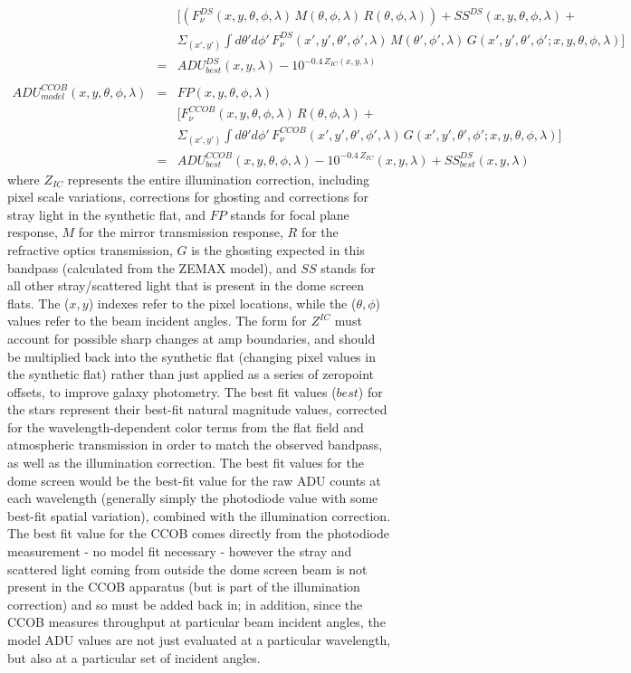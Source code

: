 \documentclass[12pt,preprint]{aastex}
\begin{document}
\begin{figure}[htbp]
{\begin{eqnarray}
& & [(F_\nu^{DS}(x,y,\theta,\phi,\lambda)\,M(\theta,\phi,\lambda)\,R(\theta,\phi,\lambda))
+ SS^{DS}(x,y,\theta,\phi,\lambda) +  \nonumber \\ 
& & \Sigma_{(x',y')} \int d\theta' d\phi' \,F_\nu^{DS}(x',y',\theta',
\phi',\lambda)\,M(\theta',\phi',\lambda)\,G(x',y',\theta',\phi';
x,y,\theta,\phi,\lambda)] \nonumber  \\
 & = & ADU^{DS}_{best}(x,y,\lambda) - 10^{-0.4 \,
   Z_{IC}(x,y,\lambda)} \\
\nonumber \\
ADU^{CCOB}_{model}(x,y,\theta,\phi,\lambda) & = &  FP(x,y,\theta,\phi,\lambda) \nonumber \\
& & [ F_\nu^{CCOB}(x,y,\theta,\phi,\lambda)\,R(\theta,\phi,\lambda) +
\nonumber \\
&& \Sigma_{(x',y')} \int d\theta' d\phi'
\,F_\nu^{CCOB}(x',y',\theta',\phi',\lambda)\,G(x',y',\theta',\phi';x,y,\theta,\phi,\lambda)]
\nonumber \\
& = & ADU^{CCOB}_{best}(x,y,\theta,\phi,\lambda) -
10^{-0.4\,Z_{IC}}(x,y,\lambda) + SS^{DS}_{best}(x,y,\lambda) 
\end{eqnarray} 
where $Z_{IC}$ represents the entire illumination correction,
including pixel scale variations, corrections for ghosting and
corrections for stray light in the synthetic flat, and $FP$ stands for
focal plane response, $M$ for the mirror transmission response, $R$ for the
refractive optics transmission, $G$ is the ghosting expected in this bandpass (calculated from
the ZEMAX model), and $SS$ stands for all other stray/scattered light
that is present in the dome screen flats. The ($x,y$) indexes refer to
the pixel locations, while the ($\theta,\phi$) values refer to the
beam incident angles. The form for
$Z^{IC}$ must account for possible sharp changes at amp boundaries,
and should be multiplied back into the synthetic flat (changing pixel
values in the synthetic flat) rather than just applied as a series of
zeropoint offsets, to improve galaxy photometry. The best fit values ($best$)
for the stars represent their best-fit natural magnitude values, corrected for the wavelength-dependent color
terms from the flat field and atmospheric transmission in order 
to match the observed bandpass, as well as the illumination
correction. The best fit values for the dome screen would be the
best-fit value for the raw ADU counts at each wavelength (generally simply the
photodiode value with some best-fit spatial
variation), combined with the illumination
correction. The best fit value for the CCOB comes directly from the
photodiode measurement - no model fit necessary - however the
stray and scattered light coming from outside the dome screen beam is
not present in the CCOB apparatus (but is part of the illumination
correction) and so must be added back in; in addition,
since the CCOB measures throughput at particular beam incident
angles, the model ADU values are not just evaluated at a particular
wavelength, but also at a particular set of incident angles. 

}
\end{figure}
\end{document}
